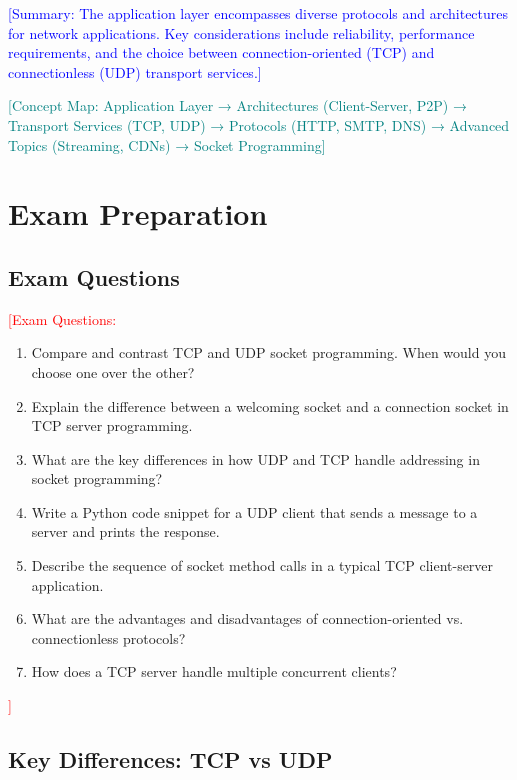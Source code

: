 \documentclass[12pt]{article}
\begin{document}
\textcolor{blue}{[Summary: The application layer encompasses diverse protocols and architectures for network applications. Key considerations include reliability, performance requirements, and the choice between connection-oriented (TCP) and connectionless (UDP) transport services.]}

\textcolor{teal}{[Concept Map: Application Layer → Architectures (Client-Server, P2P) → Transport Services (TCP, UDP) → Protocols (HTTP, SMTP, DNS) → Advanced Topics (Streaming, CDNs) → Socket Programming]}

\section*{Exam Preparation}

\subsection*{Exam Questions}

\textcolor{red}{[Exam Questions:}
\begin{enumerate}
    \item Compare and contrast TCP and UDP socket programming. When would you choose one over the other?
    \item Explain the difference between a welcoming socket and a connection socket in TCP server programming.
    \item What are the key differences in how UDP and TCP handle addressing in socket programming?
    \item Write a Python code snippet for a UDP client that sends a message to a server and prints the response.
    \item Describe the sequence of socket method calls in a typical TCP client-server application.
    \item What are the advantages and disadvantages of connection-oriented vs. connectionless protocols?
    \item How does a TCP server handle multiple concurrent clients?
\end{enumerate}
\textcolor{red}{]}

\subsection*{Key Differences: TCP vs UDP}
\end{document}
